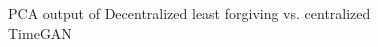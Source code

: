 \def\batchscale{0.5}
\def\batchyscale{0.3}
\def\batchcol{myblue}
\def\batchtcol{orange}
\def\markersize{0.6}

\begin{figure} [htp]
    \centering
     \hspace{0.9 cm}
    \caption{PCA output of Decentralized least forgiving vs. centralized TimeGAN}
    \label{fig:timegan-pca}
\end{figure}
